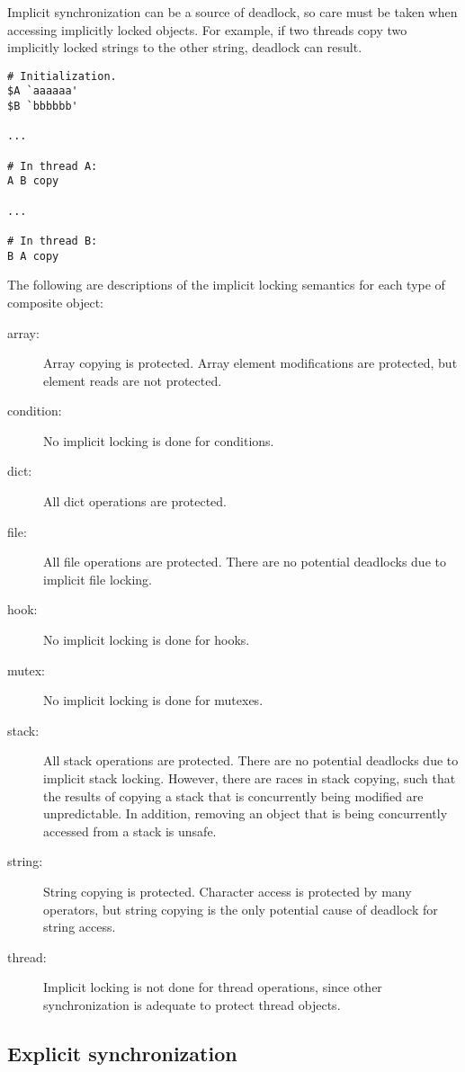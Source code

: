 Implicit synchronization can be a source of deadlock, so care must be taken when
accessing implicitly locked objects.  For example, if two threads copy two
implicitly locked strings to the other string, deadlock can result.

\begin{verbatim}
# Initialization.
$A `aaaaaa'
$B `bbbbbb'

...

# In thread A:
A B copy

...

# In thread B:
B A copy
\end{verbatim}

The following are descriptions of the implicit locking semantics for each type
of composite object:
\begin{description}
\item[array: ] Array copying is protected.  Array element modifications are
protected, but element reads are not protected.
\item[condition: ] No implicit locking is done for conditions.
\item[dict: ] All dict operations are protected.
\item[file: ] All file operations are protected.  There are no potential
deadlocks due to implicit file locking.
\item[hook: ] No implicit locking is done for hooks.
\item[mutex: ] No implicit locking is done for mutexes.
\item[stack: ] All stack operations are protected.  There are no potential
deadlocks due to implicit stack locking.  However, there are races in stack
copying, such that the results of copying a stack that is concurrently being
modified are unpredictable.  In addition, removing an object that is being
concurrently accessed from a stack is unsafe.
\item[string: ] String copying is protected.  Character access is protected by
many operators, but string copying is the only potential cause of deadlock for
string access.
\item[thread: ]  Implicit locking is not done for thread operations, since other
synchronization is adequate to protect thread objects.
\end{description}

\subsection{Explicit synchronization}

